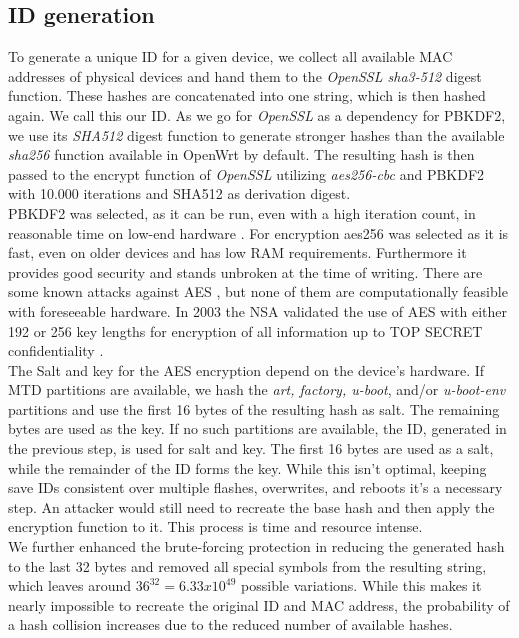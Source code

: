 \subsection{ID generation}
    To generate a unique ID for a given device, we collect all available MAC addresses of physical devices and hand them to the \textit{OpenSSL sha3-512} digest function. These hashes are concatenated into one string, which is then hashed again. We call this our ID. As we go for \textit{OpenSSL} as a dependency for PBKDF2, we use its \textit{SHA512} digest function to generate stronger hashes than the available \textit{sha256} function available in OpenWrt by default. The resulting hash is then passed to the encrypt function of \textit{OpenSSL} utilizing \textit{aes256-cbc} and PBKDF2 with 10.000 iterations and SHA512 as derivation digest.\\
    PBKDF2 was selected, as it can be run, even with a high iteration count, in reasonable time on low-end hardware \cite{ertaul_implementation_2016}. For encryption aes256 was selected as it is fast, even on older devices and has low RAM requirements. Furthermore it provides good security and stands unbroken at the time of writing. There are some known attacks against AES  \cite{schneier_another_2009} \cite{lu_new_2008} \cite{bernstein_cache-timing_nodate} \cite{biryukov_key_2009}, but none of them are computationally feasible with foreseeable hardware. In 2003 the NSA validated the use of AES with either 192 or 256 key lengths for encryption of all information up to TOP SECRET confidentiality \cite{noauthor_national_2003}.\\
    
        The Salt and key for the AES encryption depend on the device's hardware. If MTD partitions are available, we hash the \textit{art, factory, u-boot}, and/or \textit{u-boot-env} partitions and use the first 16 bytes of the resulting hash as salt. The remaining bytes are used as the key. If no such partitions are available, the ID, generated in the previous step, is used for salt and key. The first 16 bytes are used as a salt, while the remainder of the ID forms the key. While this isn't optimal, keeping save IDs consistent over multiple flashes, overwrites, and reboots it's a necessary step. An attacker would still need to recreate the base hash and then apply the encryption function to it. This process is time and resource intense.\\
    
     We further enhanced the brute-forcing protection in reducing the generated hash to the last 32 bytes and removed all special symbols from the resulting string, which leaves around $36^{32} = 6.33x10^{49}$ possible variations. While this makes it nearly impossible to recreate the original ID and MAC address, the probability of a hash collision increases due to the reduced number of available hashes.\\
    
